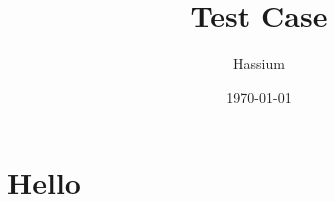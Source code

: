 \documentclass[10pt]{article}
\title{Test Case}
\author{Hassium}
\date{\today}
\begin{document}
\darkmode{}
    \maketitle
    \tableofcontents
    \section{Hello}
    \lipsum[1]
\end{document}
